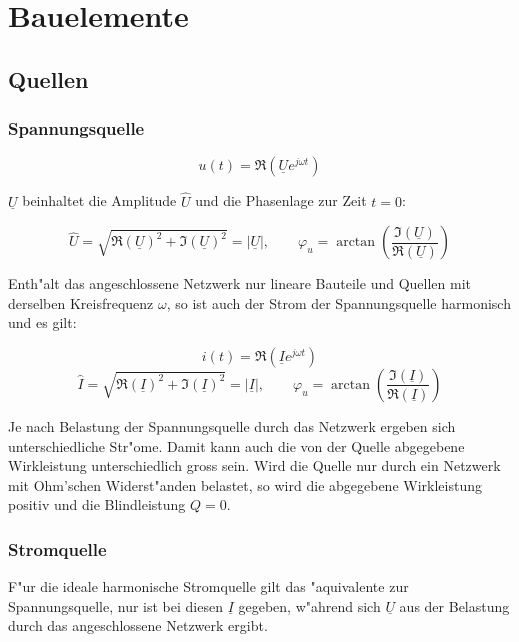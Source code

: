 \documentclass[german, 10pt, a4paper, headsepline]{scrreprt}
\theoremstyle{remark}
\begin{document}
\section{Bauelemente}

\subsection{Quellen}

\subsubsection{Spannungsquelle}

\begin{displaymath}
	u(t) = \Re(\underline{U}e^{j\omega t})
\end{displaymath}

$\underline{U}$ beinhaltet die Amplitude $\hat{U}$ und die Phasenlage zur Zeit $t=0$:

\begin{displaymath}
	\hat{U} = \sqrt{\Re(\underline{U})^2+\Im(\underline{U})^2}=|\underline{U}|, \qquad \varphi_u = \arctan(\frac{\Im(\underline{U})}{\Re(\underline{U})})
\end{displaymath}

Enth"alt das angeschlossene Netzwerk nur lineare Bauteile und Quellen mit derselben Kreisfrequenz $\omega$, so ist auch der Strom der Spannungsquelle harmonisch und es gilt:

\begin{displaymath}
	i(t) = \Re(\underline{I}e^{j\omega t})
\end{displaymath}
\begin{displaymath}
	\hat{I} = \sqrt{\Re(\underline{I})^2+\Im(\underline{I})^2}=|\underline{I}|, \qquad \varphi_u = \arctan(\frac{\Im(\underline{I})}{\Re(\underline{I})})
\end{displaymath}

Je nach Belastung der Spannungsquelle durch das Netzwerk ergeben sich unterschiedliche Str"ome. Damit kann auch die von der Quelle abgegebene Wirkleistung unterschiedlich gross sein. Wird die Quelle nur durch ein Netzwerk mit Ohm'schen Widerst"anden belastet, so wird die abgegebene Wirkleistung positiv und die Blindleistung $Q=0$.

\subsubsection{Stromquelle}
F"ur die ideale harmonische Stromquelle gilt das "aquivalente zur Spannungsquelle, nur ist bei diesen $\underline{I}$ gegeben, w"ahrend sich $\underline{U}$ aus der Belastung durch das angeschlossene Netzwerk ergibt.
\end{document}
